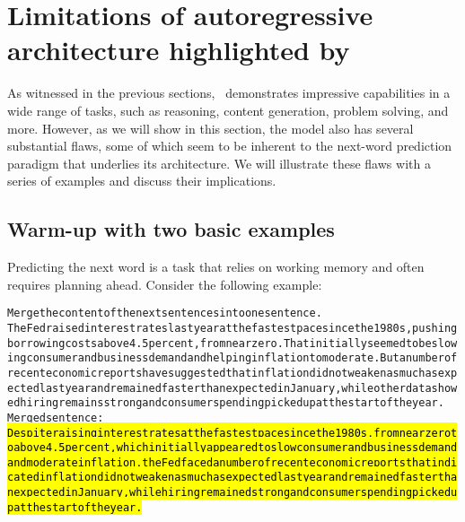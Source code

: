 \section{Limitations of autoregressive architecture highlighted by \DV}
\label{sec:limitations}
As witnessed in the previous sections, \DV\ demonstrates impressive capabilities in a wide range of tasks, such as reasoning, content generation, problem solving, and more. However, as we will show in this section, the model also has several substantial flaws, some of which seem to be inherent to the next-word prediction paradigm that underlies its architecture. We will illustrate these flaws with a series of examples and discuss their implications.

\subsection{Warm-up with two basic examples}
Predicting the next word is a task that relies on working memory and often requires planning ahead. Consider the following example:

\begin{AIbox}{\DV}
\scriptsize\vspace{-5px}
\parbox{1\textwidth}{
\begin{alltt}
Merge the content of the next sentences into one sentence. \\

The Fed raised interest rates last year at the fastest pace since the 1980s, pushing borrowing costs above 4.5 percent, from near zero. That initially seemed to be slowing consumer and business demand and helping inflation to moderate. But a number of recent economic reports have suggested that inflation did not weaken as much as expected last year and remained faster than expected in January, while other data showed hiring remains strong and consumer spending picked up at the start of the year. \\
    
Merged sentence: \\

\hl{ Despite raising interest rates at the fastest pace since the 1980s, from near zero to above 4.5 percent, which initially appeared to slow consumer and business demand and moderate inflation, the Fed faced a number of recent economic reports that indicated inflation did not weaken as much as expected last year and remained faster than expected in January, while hiring remained strong and consumer spending picked up at the start of the year.}
\end{alltt}
}
\end{AIbox}

